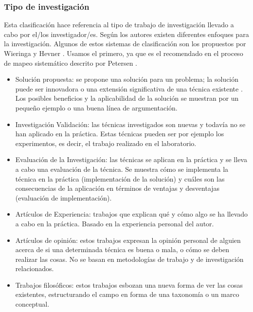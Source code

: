 \subsubsection{Tipo de investigación}
Esta clasificación hace referencia al tipo de trabajo de investigación llevado a cabo por el/los investigador/es. Según los autores existen diferentes enfoques para la investigación. Algunos de estos sistemas de clasificación son los propuestos por Wieringa \cite{Wieringa:2005} y Hevner \cite{Hevner:2004}. Usamos el primero, ya que es el recomendado en el proceso de mapeo sistemático descrito por Petersen \cite{Petersen:2008}.
\begin{itemize}
\item Solución propuesta: se propone una solución para un problema; la solución puede ser innovadora o una extensión significativa de una técnica existente . Los posibles beneficios y la aplicabilidad de la solución se muestran por un pequeño ejemplo o una buena línea de argumentación.
\item Investigación Validación: las técnicas investigados son nuevas y todavía no se han aplicado en la práctica. Estas técnicas pueden ser por ejemplo los experimentos, es decir, el trabajo realizado en el laboratorio.
\item Evaluación de la Investigación:  las técnicas se aplican en la práctica y se lleva a cabo una evaluación de la técnica. Se muestra cómo se implementa la técnica en la práctica (implementación de la solución) y cuáles son las consecuencias de la aplicación en términos de ventajas y desventajas (evaluación de implementación).
\item Artículos de Experiencia: trabajos que explican qué y cómo algo se ha llevado a cabo en la práctica. Basado en la experiencia personal del autor.
\item Artículos de opinión: estos trabajos expresan la opinión personal de alguien acerca de si una determinada técnica es buena o mala, o cómo se deben realizar las cosas. No se basan en metodologías de trabajo y de investigación relacionados.
\item Trabajos filosóficos: estos trabajos esbozan una nueva forma de ver las cosas existentes, estructurando el campo en forma de una taxonomía o un marco conceptual.
\end{itemize}

